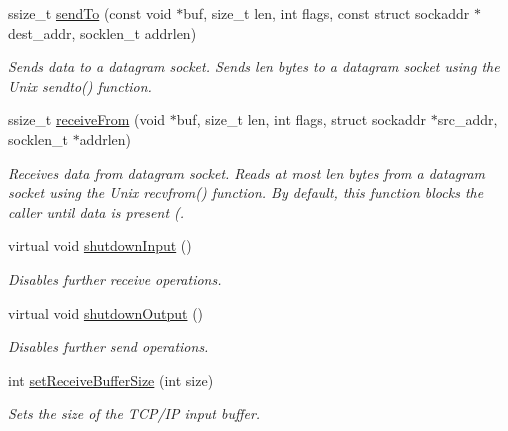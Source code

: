 \begin{DoxyCompactItemize}
ssize\+\_\+t \mbox{\hyperlink{classcppu_1_1_socket_a31ff5137959aa4e52d4bcdd53e0b0069}{send\+To}} (const void $\ast$buf, size\+\_\+t len, int flags, const struct sockaddr $\ast$dest\+\_\+addr, socklen\+\_\+t addrlen)
\begin{DoxyCompactList}\small\item\em Sends data to a datagram socket. Sends {\itshape len} bytes to a datagram socket using the Unix sendto() function. \end{DoxyCompactList}\item 
ssize\+\_\+t \mbox{\hyperlink{classcppu_1_1_socket_abd460be82deeb29e730fc83f871e51c4}{receive\+From}} (void $\ast$buf, size\+\_\+t len, int flags, struct sockaddr $\ast$src\+\_\+addr, socklen\+\_\+t $\ast$addrlen)
\begin{DoxyCompactList}\small\item\em Receives data from datagram socket. Reads at most {\itshape len} bytes from a datagram socket using the Unix recvfrom() function. By default, this function blocks the caller until data is present (. \end{DoxyCompactList}\item 
\mbox{\label{classcppu_1_1_socket_a06c6838f267e5a0ba74558da946efb90}} 
virtual void \mbox{\hyperlink{classcppu_1_1_socket_a06c6838f267e5a0ba74558da946efb90}{shutdown\+Input}} ()
\begin{DoxyCompactList}\small\item\em Disables further receive operations. \end{DoxyCompactList}\item 
\mbox{\label{classcppu_1_1_socket_a97ee9ef3bf9fdecd6ae6f2b583b34d0e}} 
virtual void \mbox{\hyperlink{classcppu_1_1_socket_a97ee9ef3bf9fdecd6ae6f2b583b34d0e}{shutdown\+Output}} ()
\begin{DoxyCompactList}\small\item\em Disables further send operations. \end{DoxyCompactList}\item 
\mbox{\label{classcppu_1_1_socket_af172d5c78f63713988b0a6bf66851be7}} 
int \mbox{\hyperlink{classcppu_1_1_socket_af172d5c78f63713988b0a6bf66851be7}{set\+Receive\+Buffer\+Size}} (int size)
\begin{DoxyCompactList}\small\item\em Sets the size of the T\+C\+P/\+IP input buffer. \end{DoxyCompactList}\item 

\end{DoxyCompactItemize}
